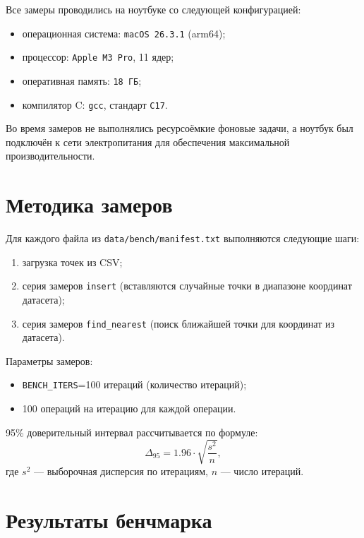 \documentclass{itmo}
\begin{document}
Все замеры проводились на ноутбуке со следующей конфигурацией:
\begin{itemize}
	\item операционная система: \texttt{macOS 26.3.1} (arm64);
	\item процессор: \texttt{Apple M3 Pro}, 11 ядер;
	\item оперативная память: \texttt{18 ГБ};
	\item компилятор C: \texttt{gcc}, стандарт \texttt{C17}.
\end{itemize}
Во время замеров не выполнялись ресурсоёмкие фоновые задачи, а ноутбук был подключён к сети электропитания для обеспечения максимальной производительности.

\section{Методика замеров}

Для каждого файла из \texttt{data/bench/manifest.txt} выполняются следующие шаги:
\begin{enumerate}
	\item загрузка точек из CSV;
	\item серия замеров \texttt{insert} (вставляются случайные точки в диапазоне координат датасета);
	\item серия замеров \texttt{find\_nearest} (поиск ближайшей точки для координат из датасета).
\end{enumerate}

Параметры замеров:
\begin{itemize}
	\item \texttt{BENCH\_ITERS}=100 итераций (количество итераций);
	\item 100 операций на итерацию для каждой операции.
\end{itemize}

95\% доверительный интервал рассчитывается по формуле:
$$
\Delta_{95} = 1.96 \cdot \sqrt{\frac{s^2}{n}},
$$
где $s^2$ --- выборочная дисперсия по итерациям, $n$ --- число итераций.

\section{Результаты бенчмарка}
\end{document}
